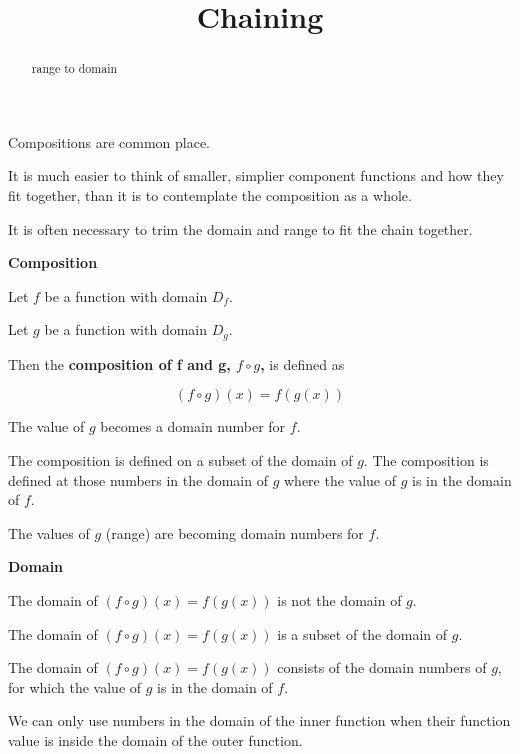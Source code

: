 \documentclass{ximera}
\title{Chaining}
\begin{document}
\begin{abstract}
range to domain
\end{abstract}
\maketitle



Compositions are common place.

It is much easier to think of smaller, simplier component functions and how they fit together, than it is to contemplate the composition as a whole.

It is often necessary to trim the domain and range to fit the chain together.



\begin{idea} \textbf{\textcolor{blue!55!black}{Composition}}  


Let $f$ be a function with domain $D_f$.


Let $g$ be a function with domain $D_g$.




Then the \textbf{composition of f and g, $f \circ g$,} is defined as

\[
(f \circ g)(x) = f(g(x))
\] 


The value of $g$ becomes a domain number for $f$.


The composition is defined on a subset of the domain of $g$.  The composition is defined at those numbers in the domain of $g$ where the value of $g$ is in the domain of $f$.




\end{idea}

The values of $g$ (range) are becoming domain numbers for $f$. 



\begin{warning} \textbf{\textcolor{red!70!black}{Domain}}

The domain of $(f \circ g)(x) = f(g(x))$ is not the domain of $g$.

The domain of $(f \circ g)(x) = f(g(x))$ is a subset of the domain of $g$.

The domain of $(f \circ g)(x) = f(g(x))$ consists of the domain numbers of $g$, for which the value of $g$ is in the domain of $f$.


\end{warning}


We can only use numbers in the domain of the inner function when their function value is inside the domain of the outer function.
\end{document}
